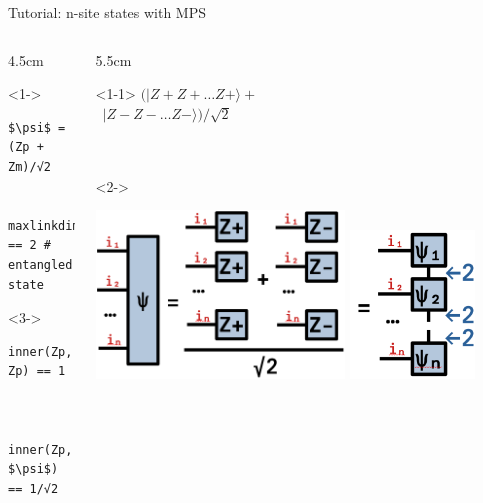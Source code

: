 \begin{frame}[fragile]{Tutorial: n-site states with MPS}

\begin{columns}

\begin{column}{4.5cm}

\begin{onlyenv}<1->
\begin{lstlisting}[language=JuliaLocal, style=julia, mathescape, basicstyle=\scriptsize\ttfamily]
$\psi$ = (Zp + Zm)/√2


maxlinkdim($\psi$) == 2 # entangled state
\end{lstlisting}
\end{onlyenv}

\begin{onlyenv}<3->
~\\
\begin{lstlisting}[language=JuliaLocal, style=julia, mathescape, basicstyle=\scriptsize\ttfamily]
  inner(Zp, Zp) == 1


  inner(Zp, $\psi$) == 1/√2
\end{lstlisting}
\end{onlyenv}

\end{column}

\begin{column}{5.5cm}

\begin{onlyenv}<1-1>
$(|Z+Z+\dots Z+\rangle +$ \\
\  $|Z-Z-\dots Z-\rangle)/\sqrt{2}$ \\
~\\
~\\
\end{onlyenv}

\begin{onlyenv}<2->
\begin{center}
\includegraphics[width=0.6\textwidth]{
  slides/assets/catn.png
}
\includegraphics[width=0.3\textwidth]{
  slides/assets/catn_mps.png
}
\end{center}
\end{onlyenv}


\end{column}
\end{columns}
\end{frame}
